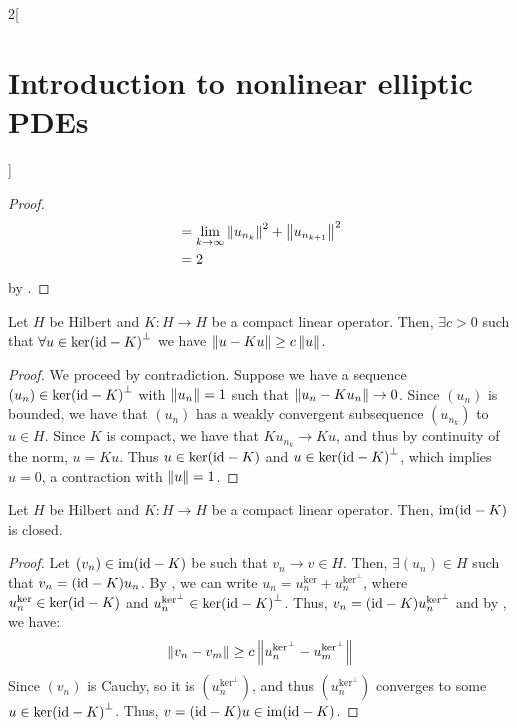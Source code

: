 \documentclass[../../../main_math.tex]{subfiles}
\begin{document}
\begin{multicols}{2}[\section{Introduction to nonlinear elliptic PDEs}]
\begin{proof}
\begin{align*}
        & =\lim_{k\to\infty}\left\|u_{n_k}\right\|^2+\left\|u_{n_{k+1}}\right\|^2 \\
        & =2
    \end{align*}
    by .
  \end{proof}
  \begin{lemma}\label{INEPDE:lemma2_fredholm}
    Let $H$ be Hilbert and $K:H\to H$ be a compact linear operator. Then, $\exists c>0$ such that $\forall u\in {\ker(\mathrm{id}-K)}^{\perp}$ we have $\left\|u-Ku\right\|\geq c\left\|u\right\|$.
  \end{lemma}
  \begin{proof}
    We proceed by contradiction. Suppose we have a sequence $(u_n)\in {\ker(\mathrm{id}-K)}^{\perp}$ with $\left\|u_n\right\|=1$ such that $\left\|u_n-Ku_n\right\|\to 0$. Since $(u_n)$ is bounded, we have that $(u_n)$ has a weakly convergent subsequence $(u_{n_k})$ to $u\in H$. Since $K$ is compact, we have that $Ku_{n_k}\to Ku$, and thus by continuity of the norm, $u=Ku$. Thus $u\in \ker(\mathrm{id}-K)$ and $u\in {\ker(\mathrm{id}-K)}^{\perp}$, which implies $u=0$, a contraction with $\left\|u\right\|=1$.
  \end{proof}
  \begin{lemma}\label{INEPDE:lemma3_fredholm}
    Let $H$ be Hilbert and $K:H\to H$ be a compact linear operator. Then, $\operatorname{im}(\mathrm{id}-K)$ is closed.
  \end{lemma}
  \begin{proof}
    Let $(v_n)\in \operatorname{im}(\mathrm{id}-K)$ be such that $v_n\to v\in H$. Then, $\exists (u_n)\in H$ such that $v_n=(\mathrm{id}-K)u_n$. By , we can write $u_n=u_n^{\text{ker}}+ u_n^{\text{ker}^\perp}$, where $u_n^{\text{ker}}\in \ker(\mathrm{id}-K)$ and $u_n^{\text{ker}^\perp}\in {\ker(\mathrm{id}-K)}^{\perp}$. Thus, $v_n=(\mathrm{id}-K)u_n^{\text{ker}^\perp}$ and by , we have:
    $$
      \left\|v_n-v_m\right\|\geq c\left\|u_n^{\text{ker}^\perp}-u_m^{\text{ker}^\perp}\right\|
    $$
    Since $(v_n)$ is Cauchy, so it is $(u_n^{\text{ker}^\perp})$, and thus $(u_n^{\text{ker}^\perp})$ converges to some $u\in {\ker(\mathrm{id}-K)}^{\perp}$. Thus, $v=(\mathrm{id}-K)u\in \operatorname{im}(\mathrm{id}-K)$.
  \end{proof}

\end{multicols}
\end{document}
